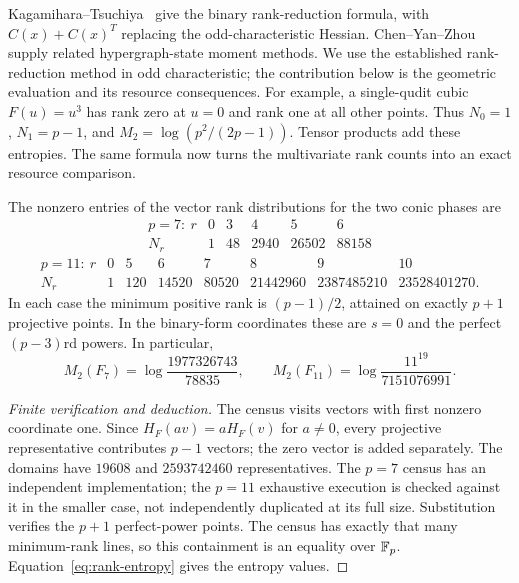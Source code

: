 Kagamihara--Tsuchiya~\cite[Theorem 1]{kagamihara} give the binary
rank-reduction formula, with $C(x)+C(x)^T$ replacing the odd-characteristic
Hessian. Chen--Yan--Zhou~\cite{chen} supply related hypergraph-state moment
methods. We use the established rank-reduction method in odd characteristic;
the contribution below is the geometric evaluation and its resource consequences.
For example, a single-qudit cubic $F(u)=u^3$ has rank zero at $u=0$ and rank
one at all other points. Thus $N_0=1$, $N_1=p-1$, and
$M_2=\log(p^2/(2p-1))$. Tensor products add these entropies. The same formula
now turns the multivariate rank counts into an exact resource comparison.

\begin{proposition}\label{prop:spectra}
The nonzero entries of the vector rank distributions for the two conic phases are
\[
\begin{array}{c|rrrrr}
p=7:\ r&0&3&4&5&6\\\hline
N_r&1&48&2940&26502&88158
\end{array}
\]
\[
\begin{array}{c|rrrrrrr}
p=11:\ r&0&5&6&7&8&9&10\\\hline
N_r&1&120&14520&80520&21442960&2387485210&23528401270.
\end{array}
\]
In each case the minimum positive rank is $(p-1)/2$, attained on exactly
$p+1$ projective points. In the binary-form coordinates these are $s=0$ and
the perfect $(p-3)$rd powers. In particular,
\[
 M_2(F_7)=\log\frac{1977326743}{78835},\qquad
 M_2(F_{11})=\log\frac{11^{19}}{7151076991}.
\]
\end{proposition}
\begin{proof}[Finite verification and deduction]
The census visits vectors with first nonzero coordinate one. Since
$H_F(av)=aH_F(v)$ for $a\ne0$, every projective representative contributes
$p-1$ vectors; the zero vector is added separately. The domains have
$19608$ and $2593742460$ representatives. The $p=7$ census has an independent
implementation; the $p=11$ exhaustive execution is checked against it in the
smaller case, not independently duplicated at its full size.
Substitution verifies the $p+1$ perfect-power points. The census has exactly
that many minimum-rank lines, so this containment is an equality over $\mathbb F_p$.
Equation~\eqref{eq:rank-entropy} gives the entropy values.
\end{proof}

